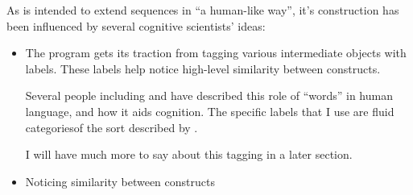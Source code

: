 \documentclass{article}
\begin{document}
As \seq is intended to extend sequences in ``a human-like way'', it's construction has been influenced by several cognitive scientists' ideas:

\begin{itemize}
\item The program gets its traction from tagging various intermediate objects with labels. These labels help \seq notice high-level similarity between constructs.

Several people including \dan and \andy have described this role of ``words'' in human language, and how it aids cognition. The specific labels that I use are fluid categoriesof the sort described by \hof.

I will have much more to say about this tagging in a later section.

\item Noticing similarity between constructs
\end{itemize}



\printindex
\end{document}
